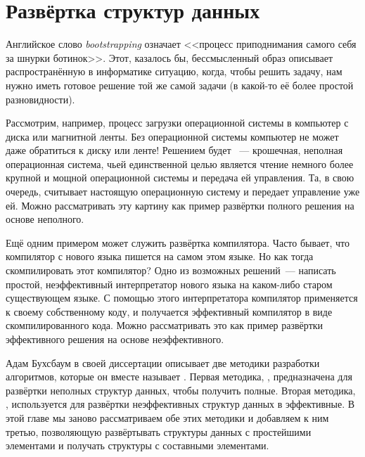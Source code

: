 \chapter{Развёртка структур данных}
\label{ch:10}

Английское слово \textit{bootstrapping} 
означает <<процесс приподнимания самого себя за шнурки
ботинок>>. Этот, казалось бы, бессмысленный образ описывает
распространённую в информатике ситуацию, когда, чтобы решить задачу,
нам нужно иметь готовое решение той же самой задачи (в какой-то её
более простой разновидности).

Рассмотрим, например, процесс загрузки операционной системы в
компьютер с диска или магнитной ленты. Без операционной системы
компьютер не может даже обратиться к диску или ленте! Решением будет
~--- крошечная, неполная
операционная система, чьей единственной целью является чтение немного
более крупной и мощной операционной системы и передача ей
управления. Та, в свою очередь, считывает настоящую операционную
систему и передает управление уже ей. Можно рассматривать эту картину
как пример развёртки полного решения на основе неполного.

Ещё одним примером может служить развёртка компилятора. Часто бывает,
что компилятор с нового языка пишется на самом этом языке. Но как
тогда скомпилировать этот компилятор? Одно из возможных решений~--- написать простой,
неэффективный интерпретатор нового языка на каком-либо старом
существующем языке. С помощью этого интерпретатора компилятор применяется
к своему собственному коду, и получается эффективный компилятор в
виде скомпилированного кода. Можно рассматривать это как пример
развёртки эффективного решения на основе неэффективного.

Адам Бухсбаум в своей диссертации \cite{Buchsbaum1993} описывает две
методики разработки алгоритмов, которые он вместе называет
. Первая методика, , предназначена для развёртки
неполных структур данных, чтобы получить полные. Вторая методика,
, используется
для развёртки неэффективных структур данных в эффективные. В этой
главе мы заново рассматриваем обе этих методики и добавляем к ним
третью, позволяющую развёртывать структуры данных с простейшими
элементами и получать структуры с составными элементами.

